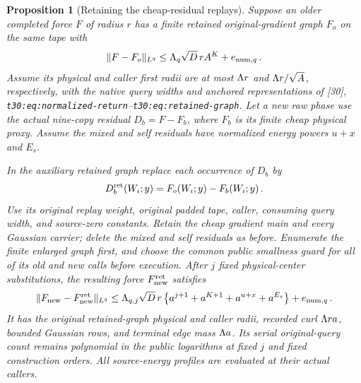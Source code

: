 \documentclass[11pt]{article}
\numberwithin{equation}{section}
\newtheorem{proposition}[theorem]{Proposition}
\theoremstyle{remark}\newtheorem{remark}[theorem]{Remark}
\newcommand{\norm}[1]{\lVert#1\rVert}
\newcommand{\src}[1]{\texttt{\nolinkurl{#1}}}
\begin{document}
\begin{proposition}[Retaining the cheap-residual replays]
\label{prop:replay-retention}
Suppose an older completed force $F$ of radius $r$ has a finite
retained original-gradient graph $F_o$ on the same tape with
\[
 \norm{F-F_o}_{L^q}\le\LL_q\sqrt D\,r A^K+e_{{\rm num},q}\,.
\]
Assume its physical and caller first radii are at most
$\Lambda r$ and $\Lambda r/\sqrt A$, respectively, with the native query
widths and anchored representations of [30],
\src{t30:eq:normalized-return}--\src{t30:eq:retained-graph}.
Let a new raw phase use the actual nine-copy residual
$D_b=F-F_b$, where $F_b$ is its finite cheap physical proxy.
Assume the mixed and self residuals have normalized energy powers
$u+x$ and $E_s$.

In the auxiliary retained graph replace each occurrence of $D_b$ by
\begin{equation}\label{eq:retained-replay-program}
 D_b^{\rm ret}(W_i;y)=F_o(W_i;y)-F_b(W_i;y)\,.
\end{equation}
Use its original replay weight, original padded tape, caller, consuming
query width, and source-zero constants. Retain the cheap gradient main
and every Gaussian carrier; delete the mixed and self residuals as before.
Enumerate the finite enlarged graph first, and choose the common public
smallness guard for all of its old and new calls before execution.
After $j$ fixed physical-center substitutions, the resulting force
$F_{\rm new}^{\rm ret}$ satisfies
\begin{equation}\label{eq:improved-retained-tail}
 \norm{F_{\rm new}-F_{\rm new}^{\rm ret}}_{L^q}
 \le\LL_{q,j}\sqrt D\,r\,
 \bigl\{a^{j+1}+a^{K+1}+a^{u+x}+a^{E_s}\bigr\}
       +e_{{\rm num},q}\,.
\end{equation}
It has the original retained-graph physical and caller radii,
recorded curl $\Lambda ra$, bounded Gaussian rows, and terminal edge
mass $\Lambda a$. Its serial original-query count remains polynomial
in the public logarithms at fixed $j$ and fixed construction orders.
All source-energy profiles are evaluated at their actual callers.
\end{proposition}
\end{document}
